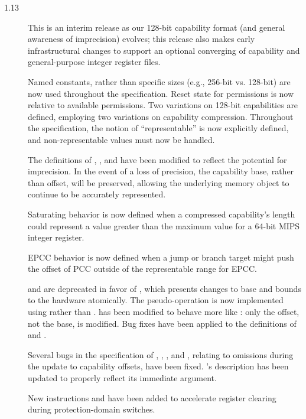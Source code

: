 \begin{description}
\item[1.13] This is an interim release as our 128-bit capability format (and
  general awareness of imprecision) evolves; this release also makes early
  infrastructural changes to support an optional converging of capability and
  general-purpose integer register files.

  Named constants, rather than specific sizes (e.g., 256-bit vs. 128-bit) are
  now used throughout the specification.
  Reset state for permissions is now relative to available permissions.
  Two variations on 128-bit capabilities are defined, employing two variations
  on capability compression.
  Throughout the specification, the notion of ``representable'' is now
  explicitly defined, and non-representable values must now be handled.

  The definitions of , , and
   have been modified to reflect the potential for
  imprecision.
  In the event of a loss of precision, the capability base, rather than
  offset, will be preserved, allowing the underlying memory object to continue
  to be accurately represented.

  Saturating behavior is now defined when a compressed capability's length
  could represent a value greater than the maximum value for a 64-bit MIPS
  integer register.

  EPCC behavior is now defined when a jump or branch target might push the
  offset of PCC outside of the representable range for EPCC.

   and  are deprecated in favor
  of , which presents changes to base and bounds to
  the hardware atomically.
  The  pseudo-operation is now implemented using
   rather than .
   has been modified to behave more like
  : only the offset, not the base, is modified.
  Bug fixes have been applied to the definitions of 
  and .

  Several bugs in the specification of , ,
  , and , relating to omissions
  during the update to capability offsets, have been fixed.
  's description has been updated to properly reflect its
  immediate argument.

  New instructions  and  have
  been added to accelerate register clearing during protection-domain
  switches.


\end{description}
